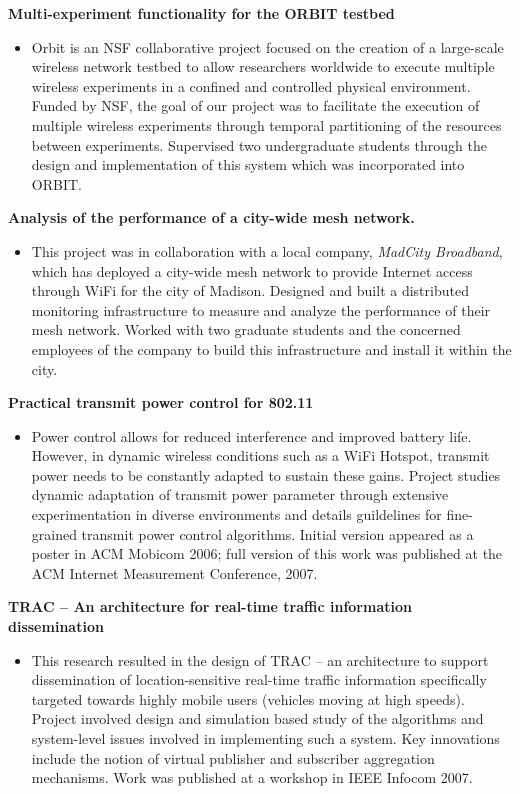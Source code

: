 \begin{resume}
{\bf Multi-experiment functionality for the ORBIT testbed}
    \begin{itemize}
	\item [] Orbit is an NSF collaborative project focused on the creation of a large-scale wireless network testbed
to allow researchers worldwide to execute  multiple wireless experiments in a
confined and controlled  physical environment.  Funded by NSF, the goal of our
project was to facilitate the execution of multiple wireless experiments
through temporal partitioning of the resources between experiments. Supervised two
undergraduate students through the design and implementation of this system
which was incorporated into ORBIT.
    \end{itemize}
\vspace{-0.2cm}
{\bf Analysis of the performance of a city-wide mesh network. }
    \begin{itemize}
	\item [] This project was in collaboration with a local company, {\it MadCity
 Broadband}, which has deployed a city-wide mesh network to provide Internet access through WiFi
for the city of Madison. Designed and built a distributed monitoring
infrastructure to measure and analyze the performance of their mesh network.
Worked with two graduate students and the concerned employees of the company to
build this infrastructure and install it within the city. 
    \end{itemize}
\vspace{-0.2cm}

{\bf Practical transmit power control for 802.11}

\begin{itemize}
\item [] Power control allows for reduced interference and improved battery life.
However, in dynamic wireless conditions such as a WiFi Hotspot, transmit power
needs to be constantly adapted to sustain these gains. Project studies dynamic
adaptation of transmit power parameter through extensive experimentation in
diverse environments and details guildelines for fine-grained transmit power
control algorithms. Initial version appeared as a poster in ACM Mobicom 2006;
full version of this work was published at the ACM Internet Measurement
Conference, 2007.
\end{itemize} \vspace{-0.2cm}

{\bf TRAC -- An architecture for real-time traffic information dissemination}
    \begin{itemize}
	\item [] This research resulted in the design of TRAC -- an architecture to support dissemination of location-sensitive real-time traffic information
specifically targeted towards highly mobile users (vehicles moving at high speeds). Project involved design and
simulation based study of the algorithms and system-level issues involved in implementing such a system. Key innovations
include the notion of virtual publisher and subscriber aggregation mechanisms.
Work was published at a workshop in IEEE Infocom 2007.
    \end{itemize}


\end{resume}
